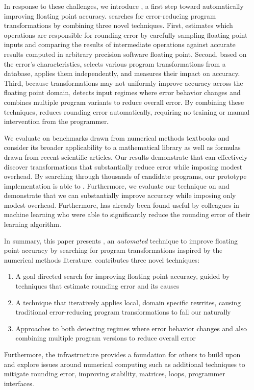 \documentclass[paper.tex]{subfiles}
\begin{document}
In response to these challenges, we introduce \casio, a first step
toward automatically improving floating point accuracy.  \casio
searches for error-reducing program transformations by combining three
novel techniques.  First, \casio estimates which operations are
responsible for rounding error by carefully sampling floating point
inputs and comparing the results of intermediate operations against
accurate results computed in arbitrary precision software floating
point.  Second, based on the error's characteristics, \casio selects
various program transformations from a database, applies them
independently, and measures their impact on accuracy.  Third, because
transformations may not uniformly improve accuracy across the floating
point domain, \casio detects input regimes where error behavior
changes and combines multiple program variants to reduce overall
error.  By combining these techniques, \casio reduces rounding error
automatically, requiring no training or manual intervention from the
programmer.

We evaluate \casio on benchmarks drawn from numerical methods
textbooks and consider its broader applicability to a mathematical
library as well as formulas drawn from recent scientific articles.
Our results demonstrate that \casio can effectively discover
transformations that substantially reduce error while imposing modest
overhead.  By searching through thousands of candidate programs, our
prototype implementation is able to .  Furthermore, we evaluate our technique on
 and demonstrate that we can
substantially improve accuracy while imposing only modest overhead.
Furthermore, \casio has already been found useful by colleagues in
machine learning who were able to significantly reduce the rounding
error of their learning algorithm.

In summary, this paper presents \casio, an \textit{automated}
technique to improve floating point accuracy by searching for program
transformations inspired by the numerical methods literature.  \casio
contributes three novel techniques:
\begin{enumerate}
\item A goal directed search for improving floating point accuracy,
  guided by techniques that estimate rounding error and its causes
\item A technique that iteratively applies local, domain specific
  rewrites, causing traditional error-reducing program transformations
  to fall our naturally
\item Approaches to both detecting regimes where error behavior
  changes and also combining multiple program versions to reduce
  overall error
\end{enumerate}
Furthermore, the \casio infrastructure provides a foundation for
others to build upon and explore issues around numerical computing
such as additional techniques to mitigate rounding error, improving
stability, matrices, loops, programmer interfaces.
\end{document}
